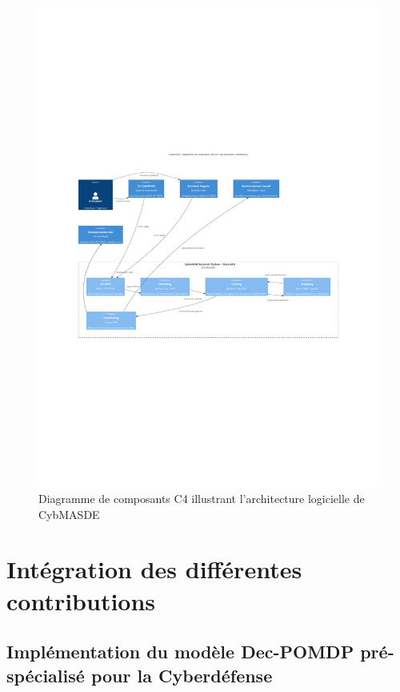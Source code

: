 \begin{figure}
  \centering
  \includegraphics[trim={2.25cm 9cm 2.25cm 10cm},clip,width=\textwidth]{figures/CybMASDE_internal_component_diagram.pdf}
  \caption{Diagramme de composants C4 illustrant l'architecture logicielle de CybMASDE}
  \label{fig:cybmasde_uml}
\end{figure}

\section{Intégration des différentes contributions}

\subsection{Implémentation du modèle Dec-POMDP pré-spécialisé pour la Cyberdéfense}

